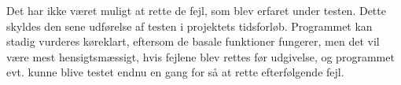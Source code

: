 Det har ikke været muligt at rette de fejl, som blev erfaret under testen. Dette skyldes den sene udførelse af testen i projektets tidsforløb. Programmet kan stadig vurderes køreklart, eftersom de basale funktioner fungerer, men det vil være mest hensigtsmæssigt, hvis fejlene blev rettes før udgivelse, og programmet evt. kunne blive testet endnu en gang for så at rette efterfølgende fejl.